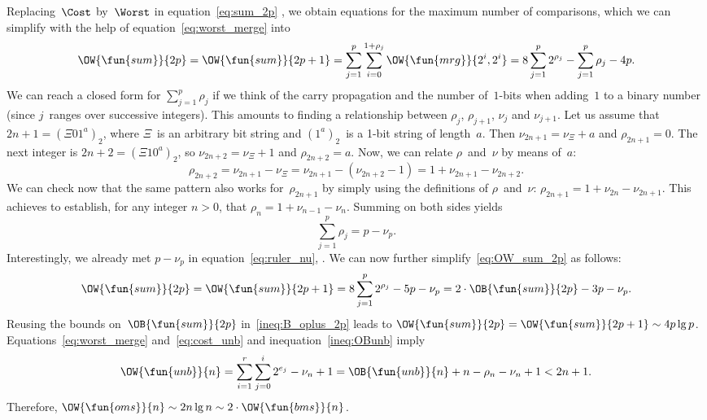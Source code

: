 Replacing~\(\Cost\) by~\(\Worst\) in equation~\eqref{eq:sum_2p}
, we obtain equations for the maximum number of
comparisons, which we can simplify with the help of
equation~\eqref{eq:worst_merge}  into
\begin{equation}
\OW{\fun{sum}}{2p}
  = \OW{\fun{sum}}{2p+1}
  = \sum_{j=1}^{p}\sum_{i=0}^{1+\rho_{j}}{\OW{\fun{mrg}}{2^i,2^i}}
  = 8\sum_{j=1}^{p}{2^{\rho_j}} - \sum_{j=1}^{p}\rho_j - 4p.
\label{eq:OW_sum_2p}
\index{sum@$\OW{\fun{sum}}{n}$}
\end{equation}
  We can reach a closed form
for \(\sum_{j=1}^{p}\rho_j\) if we think of the carry propagation and
the number of~\(1\)-bits when adding~\(1\) to a binary number (since
\(j\)~ranges over successive integers). This amounts to finding a
relationship between \(\rho_j\), \(\rho_{j+1}\), \(\nu_j\) and
\(\nu_{j+1}\). Let us assume that \(2n+1 = (\Xi 01^a)_2\), where
\(\Xi\)~is an arbitrary bit string and \((1^a)_2\)~is a 1-bit string
of length~\(a\). Then \(\nu_{2n+1} = \nu_{\Xi} + a\) and \(\rho_{2n+1}
= 0\). The next integer is \(2n+2 = (\Xi 10^a)_2\), so \(\nu_{2n+2} =
\nu_{\Xi} + 1\) and \(\rho_{2n+2} = a\). Now, we can relate
\(\rho\)~and~\(\nu\) by means of~\(a\):
\begin{equation*}
  \rho_{2n+2} = \nu_{2n+1} - \nu_{\Xi} = \nu_{2n+1} - (\nu_{2n+2} - 1)
  = 1 + \nu_{2n+1} - \nu_{2n+2}.
\end{equation*}
We can check now that the same pattern also works
for~\(\rho_{2n+1}\) by simply using the definitions of
\(\rho\)~and~\(\nu\): \(\rho_{2n+1} = 1 + \nu_{2n} -
\nu_{2n+1}\). This achieves to establish, for any integer \(n>0\),
that \(\rho_n = 1 + \nu_{n-1} - \nu_{n}\). Summing on both sides
yields
\begin{equation*}
\sum_{j=1}^{p}{\rho_j} = p - \nu_p.
\end{equation*}
Interestingly, we already met \(p - \nu_p\)  in equation~\eqref{eq:ruler_nu},
. We can now further
simplify~\eqref{eq:OW_sum_2p} as follows:
\begin{equation*}
\OW{\fun{sum}}{2p}
 = \OW{\fun{sum}}{2p+1}
 = 8\sum_{j=1}^{p}{2^{\rho_j}} - 5p - \nu_p
 = 2 \cdot \OB{\fun{sum}}{2p} - 3p - \nu_p.
\index{sum@$\OW{\fun{sum}}{n}$}
\end{equation*}
Reusing the bounds on~\(\OB{\fun{sum}}{2p}\)
in~\eqref{ineq:B_oplus_2p} leads to \(\OW{\fun{sum}}{2p} =
\OW{\fun{sum}}{2p+1} \sim 4p\lg p\). Equations~\eqref{eq:worst_merge}
and~\eqref{eq:cost_unb} and inequation~\eqref{ineq:OBunb} imply
\begin{equation*}
\OW{\fun{unb}}{n} = \sum_{i=1}^{r}\sum_{j=0}^{i}{2^{e_j}} - \nu_n + 1
                  = \OB{\fun{unb}}{n} + n - \rho_n - \nu_n + 1
                  < 2n + 1.
\end{equation*}
Therefore, \(\OW{\fun{oms}}{n} \sim 2n\lg n \sim 2
\cdot \OW{\fun{bms}}{n}\).

